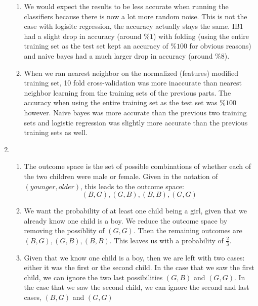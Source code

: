 \documentclass{article}
\begin{document}
\begin{enumerate}
\begin{enumerate}
                \item
                   We would expect the results to be less accurate when running the classifiers because 				there is now a lot more random noise. This is not the case with logisitc regression, the 				accuracy actually stays the same. IB1 had a slight drop in accuracy (around $\%1$) with 				folding (using the entire training set as the test set kept an accuracy of $\%100$ for 				obvious reasons) and naive bayes had a much larger drop in accuracy (around $\%8$).
                \item
                   When we ran nearest neighbor on the normalized (features) modified training set, 10 fold 		cross-validation was more inaccurate than nearest neighbor learning from the training 				sets 	of the previous parts. The accuracy when using the entire training set as the test set 			was 	$\%100$ however. Naive bayes was  more accurate than the previous two training 			sets 	and logistic regression was slightly more accurate than the previous training sets as 			well.   
            \end{enumerate}
        \item
            \begin{enumerate}
                \item The outcome space is the set of possible combinations of whether
                      each of the two children were male or female. Given in the notation
                      of $(younger, older)$, this leads to the outcome space:
                      $$
                        (B, G), (G, B), (B, B), (G, G)
                      $$
                \item We want the probability of at least one child being a girl, given
                      that we already know one child is a boy. We reduce the outcome space
                      by removing the possiblity of $(G, G)$. Then the remaining outcomes
                      are $(B, G), (G, B), (B, B)$. This leaves us with a probability
                      of $\frac{2}{3}$.
                \item Given that we know one child is a boy, then we are left with two
                    cases: either it was the first or the second child. In the case that
                    we saw the first child, we can ignore the two last possibilities
                    $(G, B)$ and $(G, G)$. In the case that we saw the second child, we
                    can ignore the second and last cases, $(B, G)$ and $(G, G)$\\

\end{enumerate}
\end{enumerate}
\end{document}
